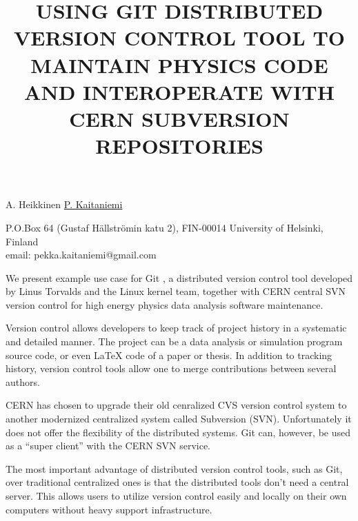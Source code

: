 \documentclass[12pt]{article}
\begin{document}
\title{USING GIT DISTRIBUTED VERSION CONTROL TOOL TO MAINTAIN PHYSICS
  CODE AND INTEROPERATE WITH CERN SUBVERSION REPOSITORIES}

A. Heikkinen \underline{P. Kaitaniemi}

P.O.Box 64 (Gustaf H\"allstr\"omin katu 2), FIN-00014 University of Helsinki, Finland\\
email: pekka.kaitaniemi@gmail.com

\vspace{\baselineskip}


We present example use case for Git \cite{gitsite}, a distributed version control
tool developed by Linus Torvalds and the Linux kernel team, together
with CERN central SVN \cite{cernsvn} version control for high energy physics data
analysis software maintenance.

Version control allows developers to keep track of project history in
a systematic and detailed manner. The project can be a data analysis
or simulation program source code, or even LaTeX code of a paper or
thesis. In addition to tracking history, version control tools allow
one to merge contributions between several authors.

CERN has chosen to upgrade their old cenralized CVS version control
system to another modernized centralized system called Subversion \cite{svnsite}
(SVN). Unfortunately it does not offer the flexibility of the
distributed systems. Git can, however, be used as a ``super client''
with the CERN SVN service.

The most important advantage of distributed version control tools,
such as Git, over traditional centralized ones is that the distributed
tools don't need a central server. This allows users to utilize
version control easily and locally on their own computers without
heavy support infrastructure.

\end{document}
